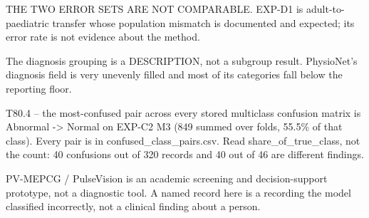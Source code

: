 \begin{table}[htbp]
  \par\footnotesize THE TWO ERROR SETS ARE NOT COMPARABLE. EXP-D1 is adult-to-paediatric transfer whose population mismatch is documented and expected; its error rate is not evidence about the method.
  \par\footnotesize The diagnosis grouping is a DESCRIPTION, not a subgroup result. PhysioNet's diagnosis field is very unevenly filled and most of its categories fall below the reporting floor.
  \par\footnotesize T80.4 -- the most-confused pair across every stored multiclass confusion matrix is Abnormal -> Normal on EXP-C2 M3 (849 summed over folds, 55.5\% of that class). Every pair is in confused\_class\_pairs.csv. Read share\_of\_true\_class, not the count: 40 confusions out of 320 records and 40 out of 46 are different findings.
  \par\footnotesize PV-MEPCG / PulseVision is an academic screening and decision-support prototype, not a diagnostic tool. A named record here is a recording the model classified incorrectly, not a clinical finding about a person.
\end{table}
